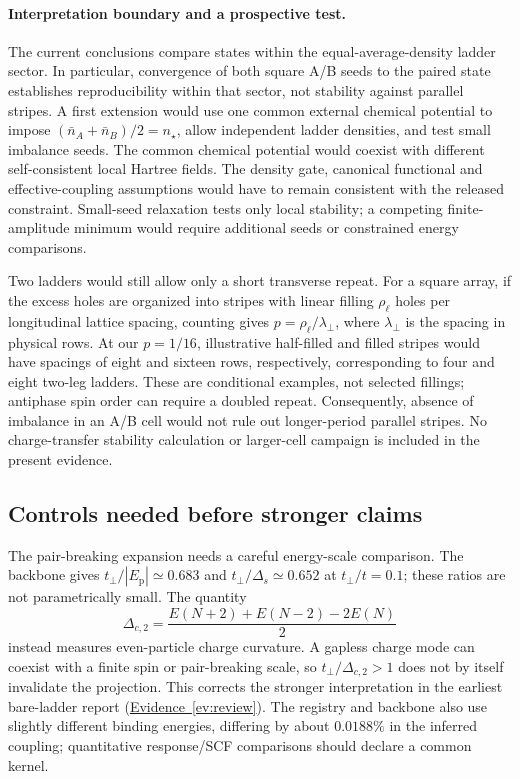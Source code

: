 \documentclass[11pt,letterpaper]{article}
\newcommand{\tp}{t_{\perp}}
\newcommand{\Ep}{E_{\mathrm p}}
\newcommand{\ev}[1]{\hyperref[ev:#1]{Evidence~\ref*{ev:#1}}}
\begin{document}
\paragraph{Interpretation boundary and a prospective test.}
The current conclusions compare states within the equal-average-density
ladder sector. In particular, convergence of both square A/B seeds to the
paired state establishes reproducibility within that sector, not stability
against parallel stripes. A first extension would use one common external
chemical potential to impose $(\bar n_A+\bar n_B)/2=n_\star$, allow
independent ladder densities, and test small imbalance seeds. The common
chemical potential would coexist with different self-consistent local
Hartree fields. The density gate, canonical functional and effective-coupling
assumptions would have to remain consistent with the released constraint.
Small-seed relaxation tests only local stability; a competing finite-amplitude
minimum would require additional seeds or constrained energy comparisons.

Two ladders would still allow only a short transverse repeat. For a square
array, if the excess holes are organized into stripes with linear filling
$\rho_\ell$ holes per longitudinal lattice spacing, counting gives
$p=\rho_\ell/\lambda_\perp$, where $\lambda_\perp$ is the spacing in
physical rows. At our $p=1/16$, illustrative half-filled and filled stripes
would have spacings of eight and sixteen rows, respectively, corresponding
to four and eight two-leg ladders. These are conditional examples, not
selected fillings; antiphase spin order can require a doubled repeat.
Consequently, absence of imbalance in an A/B cell would not rule out
longer-period parallel stripes. No charge-transfer stability calculation
or larger-cell campaign is included in the present evidence.

\subsection{Controls needed before stronger claims}

The pair-breaking expansion needs a careful energy-scale comparison.
The backbone gives $\tp/|\Ep|\simeq0.683$ and
$\tp/\Delta_s\simeq0.652$ at $\tp/t=0.1$; these ratios are not
parametrically small. The quantity
\begin{equation}
 \Delta_{c,2}=\frac{E(N+2)+E(N-2)-2E(N)}{2}
\end{equation}
instead measures even-particle charge curvature. A gapless charge mode can
coexist with a finite spin or pair-breaking scale, so
$\tp/\Delta_{c,2}>1$ does not by itself invalidate the projection.
This corrects the stronger interpretation in the earliest bare-ladder
report (\ev{review}). The registry and backbone also use slightly different
binding energies, differing by about $0.0188\%$ in the inferred coupling;
quantitative response/SCF comparisons should declare a common kernel.
\end{document}
